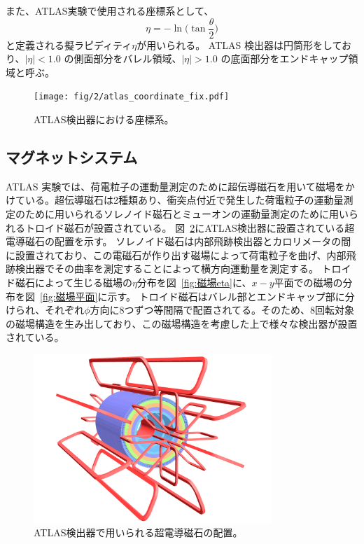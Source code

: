 また、ATLAS実験で使用される座標系として、
\begin{equation}
　\eta=-\ln\bigg(\tan\frac{\theta}{2}\bigg)
　\label{ラピディティ}
\end{equation}
と定義される擬ラピディティ$\eta$が用いられる。
ATLAS 検出器は円筒形をしており、$|\eta| < 1.0$ の側面部分をバレル領域、$|\eta| > 1.0$ の底面部分をエンドキャップ領域と呼ぶ。

\begin{figure}[tb]
  \centering
  \texttt{[image: fig/2/atlas\_coordinate\_fix.pdf]}
  \caption{ATLAS検出器における座標系。}
  \label{fig:a}
\end{figure}

\newpage
\subsection{マグネットシステム}\label{magnetic_filed}
ATLAS 実験では、荷電粒子の運動量測定のために超伝導磁石を用いて磁場をかけている。超伝導磁石は2種類あり、衝突点付近で発生した荷電粒子の運動量測定のために用いられるソレノイド磁石とミューオンの運動量測定のために用いられるトロイド磁石が設置されている。
図~\ref{fig:磁石}にATLAS検出器に設置されている超電導磁石の配置を示す。
ソレノイド磁石は内部飛跡検出器とカロリメータの間に設置されており、この電磁石が作り出す磁場によって荷電粒子を曲げ、内部飛跡検出器でその曲率を測定することによって横方向運動量を測定する。
トロイド磁石によって生じる磁場の$\eta$分布を図~\ref{fig:磁場eta}に、$x-y$平面での磁場の分布を図~\ref{fig:磁場平面}に示す。
トロイド磁石はバレル部とエンドキャップ部に分けられ、それぞれ$\phi$方向に8つずつ等間隔で配置されてる。そのため、8回転対象の磁場構造を生み出しており、この磁場構造を考慮した上で様々な検出器が設置されている。



\begin{figure}[tb]
  \centering
  \includegraphics[clip, width=9cm]{fig/2/ATLcoilGeom.pdf}
  \caption{ATLAS検出器で用いられる超電導磁石の配置\cite{Aad:1129811}。}
  \label{fig:磁石}
\end{figure}

